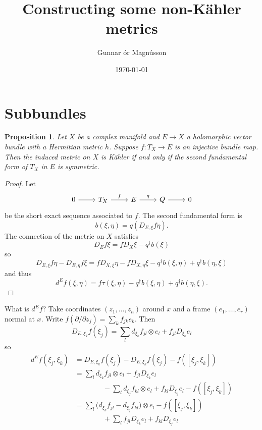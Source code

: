 \documentclass[12pt]{amsart}
\author{Gunnar \TH\'or Magn\'usson}
\date{\today}
\title{Constructing some non-K\"ahler metrics}
\newtheorem{prop}[theo]{Proposition}
\theoremstyle{definition}
\begin{document}
\maketitle


\section{Subbundles}


\begin{prop}
Let $X$ be a complex manifold and $E \to X$ a holomorphic vector bundle with a Hermitian metric $h$.
Suppose $f : T_X \to E$ is an injective bundle map.
Then the induced metric on $X$ is K\"ahler if and only if the second fundamental form of $T_X$ in $E$ is symmetric.
\end{prop}

\begin{proof}
Let
\[
\begin{tikzcd}
0 \ar[r] &
T_X \ar[r,"f"] &
E \ar[r,"q"] &
Q \ar[r] &
0
\end{tikzcd}
\]
be the short exact sequence associated to $f$.
The second fundamental form is
\[
b(\xi, \eta)
= q(D_{E,\xi} f \eta).
\]
The connection of the metric on $X$ satisfies 
\[
D_E f\xi = f D_X \xi - q^\dagger b(\xi)
\]
so
\[
D_{E,\xi} f\eta
- D_{E,\eta} f\xi 
= f D_{X,\xi} \eta
- f D_{X,\eta} \xi 
- q^\dagger b(\xi,\eta)
+ q^\dagger b(\eta,\xi)
\]
and thus
\[
d^E f(\xi,\eta)
= f \tau(\xi,\eta)
- q^\dagger b(\xi,\eta)
+ q^\dagger b(\eta,\xi).
\]
\end{proof}


What is $d^E f$?
Take coordinates $(z_1,\ldots,z_n)$ around $x$ and a frame $(e_1,\ldots,e_r)$ normal at $x$.
Write $f(\partial / \partial z_j) = \sum_k f_{jk} e_k$.
Then
\[
D_{E,\xi_k} f(\xi_j)
= \sum_{l} d_{\xi_k}f_{jl} \otimes e_l + f_{jl} D_{\xi_k} e_l
\]
so
\begin{align*}
d^E f(\xi_j, \xi_k)
&= 
D_{E,\xi_k} f(\xi_j)
- D_{E,\xi_k} f(\xi_j)
- f([\xi_j, \xi_k])
\\
&= 
\sum_{l} d_{\xi_k}f_{jl} \otimes e_l 
+ f_{jl} D_{\xi_k} e_l
\\
& \qquad\qquad
- \sum_{l} d_{\xi_j}f_{kl} \otimes e_l 
+ f_{kl} D_{\xi_j} e_l
- f([\xi_j, \xi_k])
\\
&= 
\sum_{l}\bigl(
d_{\xi_k}f_{jl}
- d_{\xi_j}f_{kl} 
\bigr ) \otimes e_l 
- f([\xi_j, \xi_k])
\\
&\qquad\qquad
+ 
\sum_{l}
f_{jl} D_{\xi_k} e_l
+ f_{kl} D_{\xi_j} e_l
\end{align*}
\end{document}
